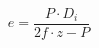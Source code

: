 \documentclass[12pt]{article}
\begin{document}
\begin{displaymath}
e = \frac {P \cdot D_i} {2f \cdot z - P}
\end{displaymath}
\end{document}
